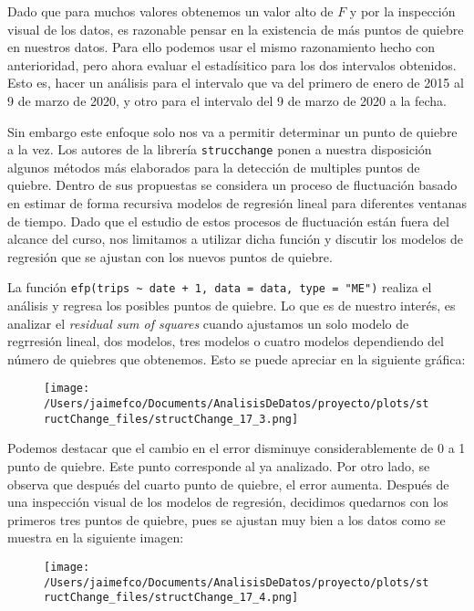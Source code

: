 \documentclass[
]{article}
\begin{document}
Dado que para muchos valores obtenemos un valor alto de \(F\) y por la
inspección visual de los datos, es razonable pensar en la existencia de
más puntos de quiebre en nuestros datos. Para ello podemos usar el mismo
razonamiento hecho con anterioridad, pero ahora evaluar el estadísitico
para los dos intervalos obtenidos. Esto es, hacer un análisis para el
intervalo que va del primero de enero de 2015 al 9 de marzo de 2020, y
otro para el intervalo del 9 de marzo de 2020 a la fecha.

Sin embargo este enfoque solo nos va a permitir determinar un punto de
quiebre a la vez. Los autores de la librería \texttt{strucchange} ponen
a nuestra disposición algunos métodos más elaborados para la detección
de multiples puntos de quiebre. Dentro de sus propuestas se considera un
proceso de fluctuación basado en estimar de forma recursiva modelos de
regresión lineal para diferentes ventanas de tiempo. Dado que el estudio
de estos procesos de fluctuación están fuera del alcance del curso, nos
limitamos a utilizar dicha función y discutir los modelos de regresión
que se ajustan con los nuevos puntos de quiebre.

La función
\texttt{efp(trips\ \textasciitilde{}\ date\ +\ 1,\ data\ =\ data,\ type\ =\ "ME")}
realiza el análisis y regresa los posibles puntos de quiebre. Lo que es
de nuestro interés, es analizar el \emph{residual sum of squares} cuando
ajustamos un solo modelo de regrresión lineal, dos modelos, tres modelos
o cuatro modelos dependiendo del número de quiebres que obtenemos. Esto
se puede apreciar en la siguiente gráfica:

\begin{figure}
\centering
\texttt{[image: /Users/jaimefco/Documents/AnalisisDeDatos/proyecto/plots/structChange\_files/structChange\_17\_3.png]}
\caption{}
\end{figure}

Podemos destacar que el cambio en el error disminuye considerablemente
de 0 a 1 punto de quiebre. Este punto corresponde al ya analizado. Por
otro lado, se observa que después del cuarto punto de quiebre, el error
aumenta. Después de una inspección visual de los modelos de regresión,
decidimos quedarnos con los primeros tres puntos de quiebre, pues se
ajustan muy bien a los datos como se muestra en la siguiente imagen:

\begin{figure}
\centering
\texttt{[image: /Users/jaimefco/Documents/AnalisisDeDatos/proyecto/plots/structChange\_files/structChange\_17\_4.png]}
\caption{}
\end{figure}
\end{document}
